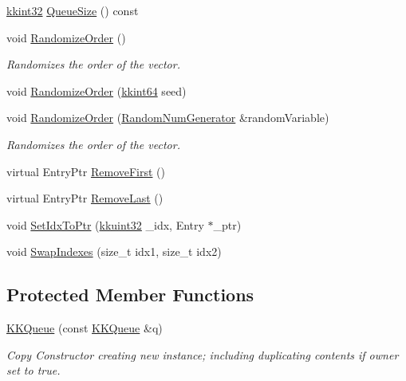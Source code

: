 \begin{DoxyCompactItemize}
\item 
\hyperlink{namespace_k_k_b_a8fa4952cc84fda1de4bec1fbdd8d5b1b}{kkint32} \hyperlink{class_k_k_b_1_1_k_k_queue_a1dab601f75ee6a65d97f02bddf71c40d}{Queue\+Size} () const 
\item 
void \hyperlink{class_k_k_b_1_1_k_k_queue_ab43920c3ec182b87d3affa1e1611e1b0}{Randomize\+Order} ()
\begin{DoxyCompactList}\small\item\em Randomizes the order of the vector. \end{DoxyCompactList}\item 
void \hyperlink{class_k_k_b_1_1_k_k_queue_a72f950cfa2e3482aa8c527eb024a57ee}{Randomize\+Order} (\hyperlink{namespace_k_k_b_aa3486b1c5ea9162b3b020c69f72826eb}{kkint64} seed)
\item 
void \hyperlink{class_k_k_b_1_1_k_k_queue_af9fd71e0f10f8383153eecbbbfce0f30}{Randomize\+Order} (\hyperlink{class_k_k_b_1_1_random_num_generator}{Random\+Num\+Generator} \&random\+Variable)
\begin{DoxyCompactList}\small\item\em Randomizes the order of the vector. \end{DoxyCompactList}\item 
virtual Entry\+Ptr \hyperlink{class_k_k_b_1_1_k_k_queue_a667988c7ff02753f1324fb6c52debf84}{Remove\+First} ()
\item 
virtual Entry\+Ptr \hyperlink{class_k_k_b_1_1_k_k_queue_ae25cc5a483346ddf4231ae30d29f0b2e}{Remove\+Last} ()
\item 
void \hyperlink{class_k_k_b_1_1_k_k_queue_a3f72bf16ba59d4269ecf5db9fad9ef9e}{Set\+Idx\+To\+Ptr} (\hyperlink{namespace_k_k_b_af8d832f05c54994a1cce25bd5743e19a}{kkuint32} \+\_\+idx, Entry $\ast$\+\_\+ptr)
\item 
void \hyperlink{class_k_k_b_1_1_k_k_queue_a7a848286a5d2ddd9b0d320557a458f66}{Swap\+Indexes} (size\+\_\+t idx1, size\+\_\+t idx2)
\end{DoxyCompactItemize}
\subsection*{Protected Member Functions}
\begin{DoxyCompactItemize}
\item 
\hyperlink{class_k_k_b_1_1_k_k_queue_ab21be04f42eefbaed9c718f32029a812}{K\+K\+Queue} (const \hyperlink{class_k_k_b_1_1_k_k_queue}{K\+K\+Queue} \&q)
\begin{DoxyCompactList}\small\item\em Copy Constructor creating new instance; including duplicating contents if owner set to true. \end{DoxyCompactList}\end{DoxyCompactItemize}


